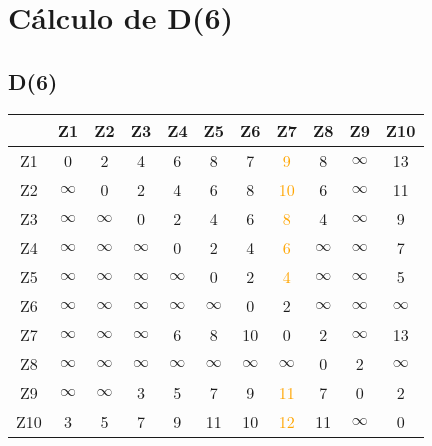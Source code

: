 \documentclass[a4paper,11pt]{article}
\begin{document}
\section*{Cálculo de D(6)}
\subsection*{D(6)}
\begin{center}
\begin{tabular}{c|cccccccccc}
 & Z1 & Z2 & Z3 & Z4 & Z5 & Z6 & Z7 & Z8 & Z9 & Z10 \\ \hline
Z1 & 0 & 2 & 4 & 6 & 8 & 7 & \textcolor{orange}{9} & 8 & $\infty$ & 13 \\
Z2 & $\infty$ & 0 & 2 & 4 & 6 & 8 & \textcolor{orange}{10} & 6 & $\infty$ & 11 \\
Z3 & $\infty$ & $\infty$ & 0 & 2 & 4 & 6 & \textcolor{orange}{8} & 4 & $\infty$ & 9 \\
Z4 & $\infty$ & $\infty$ & $\infty$ & 0 & 2 & 4 & \textcolor{orange}{6} & $\infty$ & $\infty$ & 7 \\
Z5 & $\infty$ & $\infty$ & $\infty$ & $\infty$ & 0 & 2 & \textcolor{orange}{4} & $\infty$ & $\infty$ & 5 \\
Z6 & $\infty$ & $\infty$ & $\infty$ & $\infty$ & $\infty$ & 0 & 2 & $\infty$ & $\infty$ & $\infty$ \\
Z7 & $\infty$ & $\infty$ & $\infty$ & 6 & 8 & 10 & 0 & 2 & $\infty$ & 13 \\
Z8 & $\infty$ & $\infty$ & $\infty$ & $\infty$ & $\infty$ & $\infty$ & $\infty$ & 0 & 2 & $\infty$ \\
Z9 & $\infty$ & $\infty$ & 3 & 5 & 7 & 9 & \textcolor{orange}{11} & 7 & 0 & 2 \\
Z10 & 3 & 5 & 7 & 9 & 11 & 10 & \textcolor{orange}{12} & 11 & $\infty$ & 0 \\
\end{tabular}
\end{center}
\end{document}
